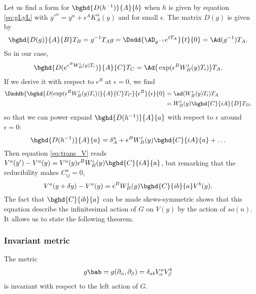 Let us find a form for $\bghd{D(h^{-1})}{A}{b}$ when $h$ is given by equation \eqref{eq:gLyL} with ${y'}^{\alpha}=y^{\alpha}+\epsilon^A K_A^{\alpha}(y)$ and for small $\epsilon$. The matrix $D(g)$ is given by
\[
   \bghd{D(g)}{A}{B}T_B=g^{-1} T_A g=\Dsdd{\AD_{g^{-1}} e^{tT_A}}{t}{0}=\Ad(g^{-1})T_A.
\]
So in our case,
\begin{equation}
  \bghd{ D(e^{\epsilon^BW_B^i(y)T_i}) }{A}{C}T_C=\Ad\big(\exp(\epsilon^BW_B^i(y)T_i)\big)T_A.
\end{equation}
If we derive it with respect to $\epsilon^B$ at $\epsilon=0$, we find
\begin{equation}
\begin{split}
    \Dsddb{  \bghd{D( \exp(\epsilon^BW_B^i(y)T_i)  )}{A}{C}T_C  }{\epsilon^B}{\epsilon}{0}
              &=\ad(W_B^i(y)T_i)T_A\\
              &=W_B^i(y)\bghd{C}{iA}{D}T_D,
\end{split}
\end{equation}
so that we can power expand $\bghd{D(h^{-1})}{A}{a}$ with respect to $\epsilon$ around $\epsilon=0$:
\begin{equation}\label{eq:Dinfin}
  \bghd{D(h^{-1})}{A}{a}=\delta^a_A+\epsilon^BW_B^i(y)\bghd{C}{iA}{a}+\ldots
\end{equation}
Then equation \eqref{eq:trans_V} reads $V^a(y')-V^a(y)=V^a(y)\epsilon^BW_B^i(y)\bghd{C}{iA}{a}$, but remarking that the reducibility makes $C_{ij}^a=0$,
\begin{equation}
 V^a(y+\delta y)-V^a(y)=\epsilon^BW_B^i(y)\bghd{C}{ib}{a}V^b(y).
\end{equation}
The fact that $\bghd{C}{ib}{a}$ can be made skews-symmetric shows that this equation describe the infinitesimal action of $G$ on $V(y)$ by the action of $so(n)$. It allows us to state the following theorem.


\subsubsection{Invariant metric}


\begin{theorem}
The metric
\begin{equation}\label{eq:metric_GH}
   g\bab=g(\partial_{\alpha},\partial_{\beta})=\delta_{ab}V_{\alpha}^aV_{\beta}^b
\end{equation}
is invariant with respect to the left action of $G$.
\end{theorem}

